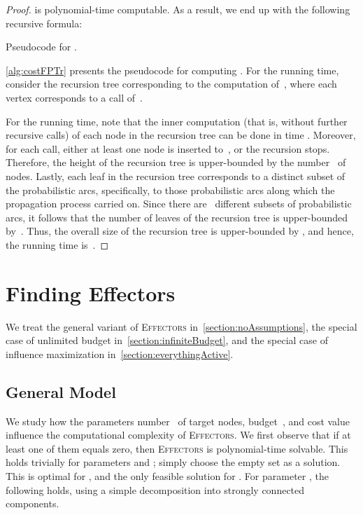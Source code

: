 \documentclass{article}
\newcommand{\probEffectors}{\textsc{Effectors}\xspace}
\begin{document}
\begin{proof}
  is polynomial-time computable.
  As a result,
  we end up with the following recursive formula:
  
  
  \begin{algorithm}[t]
    \normalsize
    \SetAlgoNoLine
    \caption{Pseudocode for .}
    \label{alg:costFPTr}
    \If{}{
      \Return  \\
    }
    \Return 
  \end{algorithm}
  
  \autoref{alg:costFPTr} presents the pseudocode for computing .
  For the running time, consider the recursion tree corresponding to
  the computation of~, where each vertex corresponds
  to a call of~.
  
  For the running time,
  note that the inner computation (that is, without further recursive calls) of each node in the recursion tree
  can be done in time .  
  Moreover, for each call, either at least one node is inserted to~,
  or the recursion stops.
  Therefore, the height of the recursion tree is upper-bounded by the number~ of nodes.
  Lastly, each leaf in the recursion tree corresponds to a distinct subset of the probabilistic arcs,
  specifically, to those probabilistic arcs along which the propagation process carried on.
  Since there are~ different subsets of probabilistic arcs,
  it follows that the number of leaves of the recursion tree is upper-bounded by~.
  Thus, the overall size of the recursion tree is upper-bounded by ,
  and hence,
  the running time is~.
\end{proof}

\section{Finding Effectors}\label{section:findingEffectors}
We treat the general variant of \probEffectors in~\autoref{section:noAssumptions}, 
the special case of unlimited budget in~\autoref{section:infiniteBudget},
and the special case of influence maximization 
in~\autoref{section:everythingActive}.

\subsection{General Model}\label{section:noAssumptions}
We study how the parameters number~ of target nodes, budget~, and cost value~ influence the computational complexity of \probEffectors.
We first observe that if at least one of them equals zero, then
\probEffectors is polynomial-time solvable.
This holds trivially for parameters  and ; simply choose the
empty set as a solution.
This is optimal for , and the only feasible solution for .
For parameter , the following holds, using a simple decomposition into 
strongly connected components.
\end{document}
